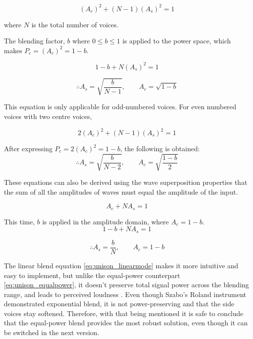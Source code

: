 \begin{equation}\label{eq:unison_energyconserv}
(A_c)^2 + (N-1)(A_s)^2 = 1
\end{equation}

where $N$ is the total number of voices.

The blending factor, $b$ where $0 \leq b \leq 1$ is applied to the power space, which makes
$P_c = (A_c)^2 = 1 - b$.

$$
1 - b + N(A_s)^2 = 1
$$

\begin{equation}\label{eq:unison_equalpower}
\therefore A_s = \sqrt{\frac{b}{N-1}}, \qquad A_c = \sqrt{1 - b}
\end{equation}

This equation is only applicable for odd-numbered voices. For even numbered voices with two
centre voices, 

\begin{equation}\label{eq:unison_energyconserveven}
2(A_c)^2 + (N-1)(A_s)^2 = 1
\end{equation}

After expressing $P_c = 2(A_c)^2 = 1 - b$, the following is obtained:
\begin{equation}\label{eq:unison_equalpower_even}
\therefore A_s = \sqrt{\frac{b}{N-2}}, \qquad A_c = \sqrt{ \frac{1 - b}{2} }
\end{equation}

These equations can also be derived using the wave superposition properties that the sum of 
all the amplitudes of waves must equal the amplitude of the input.

\begin{equation}\label{eq:unison_wavesuperpos}
A_c + NA_s = 1
\end{equation}

This time, $b$ is applied in the amplitude domain, where $A_c = 1 - b$.
$$
1 - b + NA_s = 1
$$

\begin{equation}\label{eq:unison_linearmode}
\therefore A_s = \frac{b}{N}, \qquad A_c = 1 - b
\end{equation}

The linear blend equation \eqref{eq:unison_linearmode} makes it more intuitive and easy to implement, but unlike the equal-power
counterpart \eqref{eq:unison_equalpower}, it doesn't preserve total signal power across the blending range, and leads to 
perceived loudness \cite{anthropicclaude}. Even though Szabo's Roland instrument demonstrated exponential blend, it is not power-preserving
and that the side voices stay softened. Therefore, with that being mentioned it is safe to conclude that the equal-power blend provides
the most robust solution, even though it can be switched in the next version.

